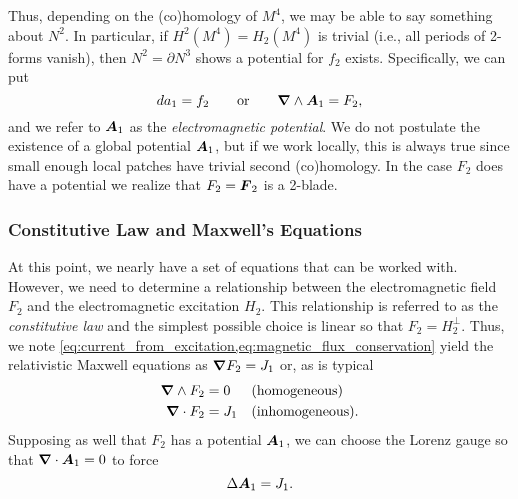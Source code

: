 \documentclass[conf]{new-aiaa}
\begin{document}
Thus, depending on the (co)homology of $M^4$, we may be able to say something about $N^2$. In particular, if $H^2(M^4)=H_2(M^4)$ is trivial (i.e., all periods of 2-forms vanish), then $N^2=\partial N^3$ shows a potential for $f_2$ exists. Specifically, we can put
\begin{equation}
da_1 = f_2 \qquad \textrm{or} \qquad \boldsymbol{\nabla} \wedge \boldsymbol{A}_1 = F_2,
\end{equation}
and we refer to $\boldsymbol{A}_1$ as the \emph{electromagnetic potential}. We do not postulate the existence of a global potential $\boldsymbol{A}_1$, but if we work locally, this is always true since small enough local patches have trivial second (co)homology. In the case $F_2$ does have a potential we realize that $F_2=\boldsymbol{F}_2$ is a 2-blade.

\subsubsection{Constitutive Law and Maxwell's Equations}

At this point, we nearly have a set of equations that can be worked with. However, we need to determine a relationship between the electromagnetic field $F_2$ and the electromagnetic excitation $H_2$. This relationship is referred to as the \emph{constitutive law} and the simplest possible choice is linear so that $F_2 = H_2^\perp$. Thus, we note \cref{eq:current_from_excitation,eq:magnetic_flux_conservation} yield the relativistic Maxwell equations as $\boldsymbol{\nabla} F_2 = J_1$ or, as is typical
\begin{align}
	\boldsymbol{\nabla} \wedge F_2 &= 0  &&\textrm{(homogeneous)}\\
	\boldsymbol{\nabla} \cdot F_2 &= J_1 && \textrm{(inhomogeneous)}.
\end{align}
Supposing as well that $F_2$ has a potential $\boldsymbol{A}_1$, we can choose the Lorenz gauge so that $\boldsymbol{\nabla} \cdot \boldsymbol{A}_1 = 0$ to force
\begin{equation}
\Delta \boldsymbol{A}_1 = J_1.
\end{equation}
\end{document}
